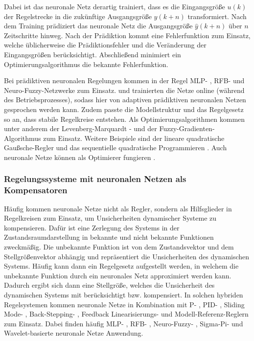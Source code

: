 Dabei ist das neuronale Netz derartig trainiert, dass es die Eingangsgröße $u(k)$ der Regelstrecke in die zukünftige Ausgangsgröße $y(k+n)$ transformiert. Nach dem Training prädiziert das neuronale Netz die Ausgangsgröße $\hat{y}(k+n)$ über $n$ Zeitschritte hinweg. Nach der Prädiktion  kommt eine Fehlerfunktion zum Einsatz, welche üblicherweise die Prädiktionsfehler und die Veränderung der Eingangsgrößen berücksichtigt. Abschließend minimiert ein Optimierungsalgorithmus die bekannte Fehlerfunktion. 

Bei prädiktiven neuronalen Regelungen kommen in der Regel MLP- \cite{Mohammadzaheri.2010}, RFB- \cite{Alexandridis.2005} und Neuro-Fuzzy-Netzwerke \cite{Liu.2006} zum Einsatz. \cite{Parlos.2001} und \cite{Alexandridis.2005} trainierten die Netze online (während des Betriebsprozesses), sodass hier von adaptiven prädiktiven neuronalen Netzen gesprochen werden kann. Zudem passte \cite{Parlos.2001} die Modellstruktur und das Regelgesetz so an, dass stabile Regelkreise entstehen. Als Optimierungsalgorithmen kommen unter anderem der Levenberg-Marquardt \cite{Mohammadzaheri.2010}- und der Fuzzy-Gradienten-Algorithmus zum Einsatz. Weitere Beispiele sind der lineare quadratische Gaußsche-Regler \cite{KKaramodin.2009} und das sequentielle quadratische Programmieren \cite{Prasad.1998} \cite{Parlos.2001}. Auch neuronale Netze können als Optimierer fungieren \cite{KOKER.2006}.

\subsubsection{Regelungssysteme mit neuronalen Netzen als Kompensatoren}

Häufig kommen neuronale Netze nicht als Regler, sondern als Hilfsglieder in Regelkreisen zum Einsatz, um Unsicherheiten dynamischer Systeme zu kompensieren. Dafür ist eine Zerlegung des Systems in der Zustandsraumdarstellung in bekannte und nicht bekannte Funktionen zweckmäßig. Die unbekannte Funktion ist von dem Zustandsvektor und dem Stellgrößenvektor abhängig und repräsentiert die Unsicherheiten des dynamischen Systems. Häufig kann dann ein Regelgesetz aufgestellt werden, in welchem die unbekannte Funktion durch ein neuronales Netz approximiert werden kann. Dadurch ergibt sich dann eine Stellgröße, welches die Unsicherheit des dynamischen Systems mit berücksichtigt bzw. kompensiert. In solchen hybriden Regelsystemen kommen neuronale Netze in Kombination mit P- \cite{Ren.2009}, PID- \cite{Hong.2009}, Sliding Mode- \cite{Han.2009}, Back-Stepping- \cite{Jolly.2009}, Feedback Linearisierungs- \cite{Yang.2007} und Modell-Referenz-Reglern \cite{Zhao.2009} zum Einsatz. Dabei finden häufig MLP- \cite{Cheng.2009}, RFB- \cite{Yang.2007}, Neuro-Fuzzy- \cite{Han.2009}, Sigma-Pi- \cite{Hong.2009} und Wavelet-basierte neuronale Netze \cite{Hsu.2009} Anwendung.

